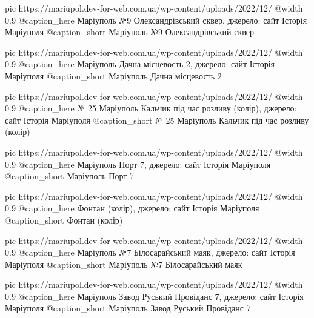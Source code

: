 	pic https://mariupol.dev-for-web.com.ua/wp-content/uploads/2022/12/%
	@width 0.9
	@caption_here Маріуполь №9 Олександрівський сквер, джерело: сайт Історія Маріуполя
	@caption_short Маріуполь №9 Олександрівський сквер

	pic https://mariupol.dev-for-web.com.ua/wp-content/uploads/2022/12/%
	@width 0.9
	@caption_here Маріуполь Дачна місцевость 2, джерело: сайт Історія Маріуполя
	@caption_short Маріуполь Дачна місцевость 2

	pic https://mariupol.dev-for-web.com.ua/wp-content/uploads/2022/12/%
	@width 0.9
	@caption_here № 25 Маріуполь Кальчик під час розливу (колір), джерело: сайт Історія Маріуполя
	@caption_short № 25 Маріуполь Кальчик під час розливу (колір)

	pic https://mariupol.dev-for-web.com.ua/wp-content/uploads/2022/12/%
	@width 0.9
	@caption_here Маріуполь Порт 7, джерело: сайт Історія Маріуполя
	@caption_short Маріуполь Порт 7

	pic https://mariupol.dev-for-web.com.ua/wp-content/uploads/2022/12/%
	@width 0.9
	@caption_here Фонтан (колір), джерело: сайт Історія Маріуполя
	@caption_short Фонтан (колір)

	pic https://mariupol.dev-for-web.com.ua/wp-content/uploads/2022/12/%
	@width 0.9
	@caption_here Маріуполь №7 Білосарайський маяк, джерело: сайт Історія Маріуполя
	@caption_short Маріуполь №7 Білосарайський маяк

	pic https://mariupol.dev-for-web.com.ua/wp-content/uploads/2022/12/%
	@width 0.9
	@caption_here Маріуполь Завод Руський Провіданс 7, джерело: сайт Історія Маріуполя
	@caption_short Маріуполь Завод Руський Провіданс 7

